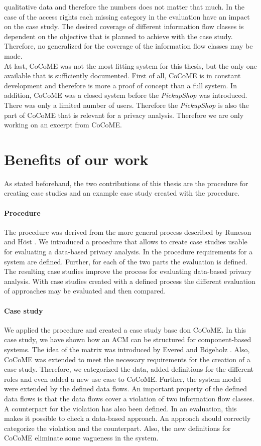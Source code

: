 qualitative data and therefore the numbers does not matter that much. In the case of the access rights each missing category in the evaluation have an impact on the case study. The desired coverage of different information flow classes is dependent on the objective that is planned to achieve with the case study. Therefore, no generalized for the coverage of the information flow classes may be made. \\
At last, CoCoME was not the most fitting system for this thesis, but the only one available that is sufficiently documented. First of all, CoCoME is in constant development and therefore is more a proof of concept than a full system. 
In addition, CoCoME was a closed system before the \textit{PickupShop} was introduced. There was only a limited number of users. Therefore the \textit{PickupShop} is also the part of CoCoME that is relevant for a privacy analysis. Therefore we are only working on an excerpt from CoCoME.
\section{Benefits of our work}
As stated beforehand, the two contributions of this thesis are the procedure for creating case studies and an example case study created with the procedure. 
\paragraph{Procedure} 
The procedure was derived from the more general process described by Runeson and Höst \cite{CaseStudySoftware}. We introduced a procedure that allows to create case studies usable for evaluating a data-based privacy analysis. In the procedure requirements for a system are defined. Further, for each of the two parts the evaluation is defined. The resulting case studies improve the process for evaluating data-based privacy analysis. With case studies created with a defined process the different evaluation of approaches may be evaluated and then compared.

\paragraph{Case study}
We applied the procedure and created a case study base don CoCoME. In this case study, we have shown how an ACM can be structured for component-based systems. The idea of the matrix was introduced by Evered and Bögeholz \cite{CaseStudyAndAccessrigths}. Also, CoCoME was extended to meet the necessary requirements for the creation of a case study. Therefore, we categorized the data, added definitions for the different roles and even added a new use case to CoCoME. Further, the system model were extended by the defined data flows. An important property of the defined data flows is that the data flows cover a violation of two information flow classes. A counterpart for the violation has also been defined. In an evaluation, this makes it possible to check a data-based approach. An approach should correctly categorize the violation and the counterpart. Also, the new definitions for CoCoME eliminate some vagueness in the system.
